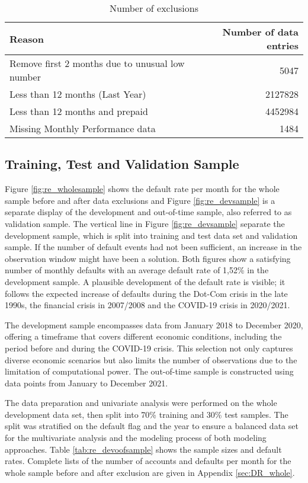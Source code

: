 \begin{table}[H]
\centering
\begin{tabular}{ l r }\toprule          										
\textbf{Reason}                                       	& \textbf{Number of data entries} 	\\\midrule
Remove first 2 months due to unusual low number 		& 5047                   			\\
Less than 12 months (Last Year)                 		& 2127828                			\\
Less than 12 months and prepaid                 		& 4452984                			\\
Missing Monthly Performance data                		& 1484  				 			\\\bottomrule
\end{tabular}%
\caption{Number of exclusions}
\label{tab:re_nr_excl}
\end{table}

\subsection{Training, Test and Validation Sample}
Figure \ref{fig:re_wholesample} shows the default rate per month for the whole sample before and after data exclusions and Figure \ref{fig:re_devsample} is a separate display of the development and out-of-time sample, also referred to as validation sample. The vertical line in Figure \ref{fig:re_devsample} separate the development sample, which is split into training and test data set and validation sample. If the number of default events had not been sufficient, an increase in the observation window might have been a solution. Both figures show a satisfying number of monthly defaults with an average default rate of 1,52\% in the development sample. A plausible development of the default rate is visible; it follows the expected increase of defaults during the Dot-Com crisis in the late 1990s, the financial crisis in 2007/2008 and the COVID-19 crisis in 2020/2021. 

The development sample encompasses data from January 2018 to December 2020, offering a timeframe that covers different economic conditions, including the period before and during the COVID-19 crisis. This selection not only captures diverse economic scenarios but also limits the number of observations due to the limitation of computational power. The out-of-time sample is constructed using data points from January to December 2021. 

The data preparation and univariate analysis were performed on the whole development data set, then split into 70\% training and 30\% test samples. The split was stratified on the default flag and the year to ensure a balanced data set for the multivariate analysis and the modeling process of both modeling approaches. Table \ref{tab:re_devoofsample} shows the sample sizes and default rates. Complete lists of the number of accounts and defaults per month for the whole sample before and after exclusion are given in Appendix \ref{sec:DR_whole}.

